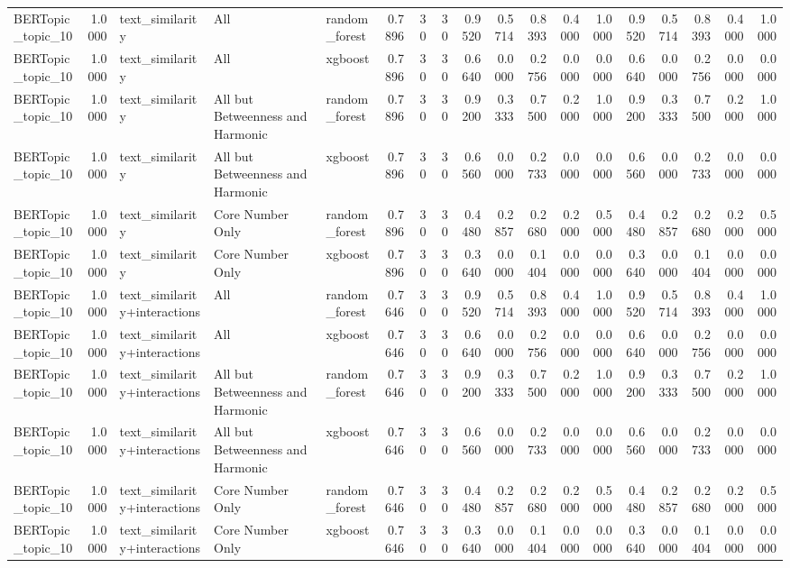 \begin{tabular}{lrlllrrrrrrrrrrrrr}
BERTopic_topic_10 & 1.0000 & text_similarity & All & random_forest & 0.7896 & 30 & 30 & 0.9520 & 0.5714 & 0.8393 & 0.4000 & 1.0000 & 0.9520 & 0.5714 & 0.8393 & 0.4000 & 1.0000 \\
BERTopic_topic_10 & 1.0000 & text_similarity & All & xgboost & 0.7896 & 30 & 30 & 0.6640 & 0.0000 & 0.2756 & 0.0000 & 0.0000 & 0.6640 & 0.0000 & 0.2756 & 0.0000 & 0.0000 \\
BERTopic_topic_10 & 1.0000 & text_similarity & All but Betweenness and Harmonic & random_forest & 0.7896 & 30 & 30 & 0.9200 & 0.3333 & 0.7500 & 0.2000 & 1.0000 & 0.9200 & 0.3333 & 0.7500 & 0.2000 & 1.0000 \\
BERTopic_topic_10 & 1.0000 & text_similarity & All but Betweenness and Harmonic & xgboost & 0.7896 & 30 & 30 & 0.6560 & 0.0000 & 0.2733 & 0.0000 & 0.0000 & 0.6560 & 0.0000 & 0.2733 & 0.0000 & 0.0000 \\
BERTopic_topic_10 & 1.0000 & text_similarity & Core Number Only & random_forest & 0.7896 & 30 & 30 & 0.4480 & 0.2857 & 0.2680 & 0.2000 & 0.5000 & 0.4480 & 0.2857 & 0.2680 & 0.2000 & 0.5000 \\
BERTopic_topic_10 & 1.0000 & text_similarity & Core Number Only & xgboost & 0.7896 & 30 & 30 & 0.3640 & 0.0000 & 0.1404 & 0.0000 & 0.0000 & 0.3640 & 0.0000 & 0.1404 & 0.0000 & 0.0000 \\
BERTopic_topic_10 & 1.0000 & text_similarity+interactions & All & random_forest & 0.7646 & 30 & 30 & 0.9520 & 0.5714 & 0.8393 & 0.4000 & 1.0000 & 0.9520 & 0.5714 & 0.8393 & 0.4000 & 1.0000 \\
BERTopic_topic_10 & 1.0000 & text_similarity+interactions & All & xgboost & 0.7646 & 30 & 30 & 0.6640 & 0.0000 & 0.2756 & 0.0000 & 0.0000 & 0.6640 & 0.0000 & 0.2756 & 0.0000 & 0.0000 \\
BERTopic_topic_10 & 1.0000 & text_similarity+interactions & All but Betweenness and Harmonic & random_forest & 0.7646 & 30 & 30 & 0.9200 & 0.3333 & 0.7500 & 0.2000 & 1.0000 & 0.9200 & 0.3333 & 0.7500 & 0.2000 & 1.0000 \\
BERTopic_topic_10 & 1.0000 & text_similarity+interactions & All but Betweenness and Harmonic & xgboost & 0.7646 & 30 & 30 & 0.6560 & 0.0000 & 0.2733 & 0.0000 & 0.0000 & 0.6560 & 0.0000 & 0.2733 & 0.0000 & 0.0000 \\
BERTopic_topic_10 & 1.0000 & text_similarity+interactions & Core Number Only & random_forest & 0.7646 & 30 & 30 & 0.4480 & 0.2857 & 0.2680 & 0.2000 & 0.5000 & 0.4480 & 0.2857 & 0.2680 & 0.2000 & 0.5000 \\
BERTopic_topic_10 & 1.0000 & text_similarity+interactions & Core Number Only & xgboost & 0.7646 & 30 & 30 & 0.3640 & 0.0000 & 0.1404 & 0.0000 & 0.0000 & 0.3640 & 0.0000 & 0.1404 & 0.0000 & 0.0000 \\

\end{tabular}
